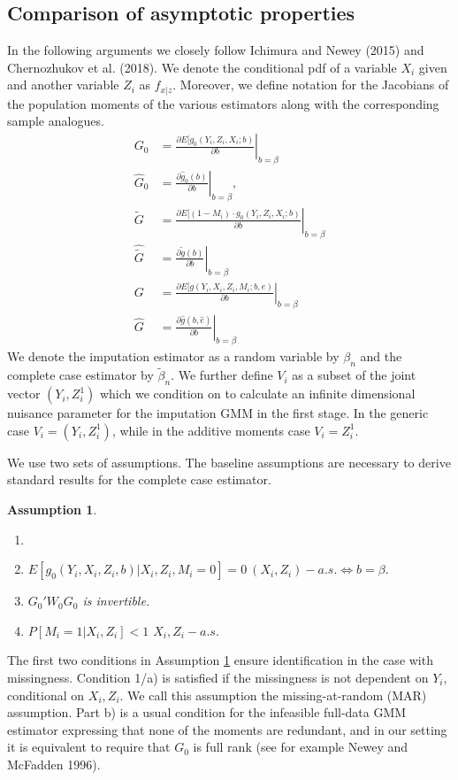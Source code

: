 \documentclass{article}
\newtheorem{assumption}{Assumption}
\theoremstyle{definition}
\theoremstyle{remark}
\begin{document}
\subsection{Comparison of asymptotic properties}\label{sec_genericTheory}
In the following arguments we closely follow Ichimura and Newey (2015) and Chernozhukov et al. (2018). We denote the conditional pdf of a variable $X_i$ given and another variable $Z_i$ as $f_{x|z}$. Moreover, we define notation for the Jacobians of the population moments of the various estimators along with the corresponding sample analogues. 
\begin{align*}
G_0 &= \left.\frac{\partial E[g_0(Y_i, Z_i, X_i; b)}{\partial b}\right|_{b=\beta} \\
\hat{G}_0 &= \left.\frac{\partial \hat{g}_0(b)}{\partial b}\right|_{b=\beta},\\
\tilde{G} &= \left.\frac{\partial E[(1-M_i)\cdot g_0(Y_i, Z_i, X_i; b)}{\partial b}\right|_{b=\beta} \\
\hat{\tilde{G}} &= \left.\frac{\partial \tilde{g}(b)}{\partial b}\right|_{b=\beta}\\
G &= \left.\frac{\partial E[g(Y_i, X_i, Z_i, M_i; b, e)}{\partial b}\right|_{b=\beta}\\
\hat{G} &= \left.\frac{\partial \hat{g}(b, \hat{e})}{\partial b}\right|_{b=\beta}
\end{align*}
We denote the imputation estimator as a random variable by $\beta_n$ and the complete case estimator by $\tilde{\beta}_n$. We further define $V_i$ as a subset of the joint vector $(Y_i, Z_i^1)$ which we condition on to calculate an infinite dimensional nuisance parameter for the imputation GMM in the first stage. In the generic case $V_i=(Y_i, Z_i^1)$, while in the additive moments case $V_i = Z_i^1$.

We use two sets of assumptions. The baseline assumptions are necessary to derive standard results for the complete case estimator.
\begin{assumption}\label{ass_baseline}
\begin{enumerate}
\item[]
\item[a)] $E[g_0(Y_i, X_i, Z_i, b)|X_i, Z_i, M_i=0] = 0 \ (X_i, Z_i)-a.s. \Leftrightarrow b=\beta.$
\item[b)] $G_0'W_0G_0$ is invertible.
\item[c)] $P[M_i=1|X_i,Z_i]<1$ $X_i,Z_i-a.s.$
\end{enumerate}
\end{assumption}
The first two conditions in Assumption \ref{ass_baseline} ensure identification in the case with missingness. Condition 1/a) is satisfied if the missingness is not dependent on $Y_i$, conditional on $X_i, Z_i$. We call this assumption the missing-at-random (MAR) assumption. Part b) is a usual condition for the infeasible full-data GMM estimator expressing that none of the moments are redundant, and in our setting it is equivalent to require that $G_0$ is full rank (see for example Newey and McFadden 1996).
\end{document}
